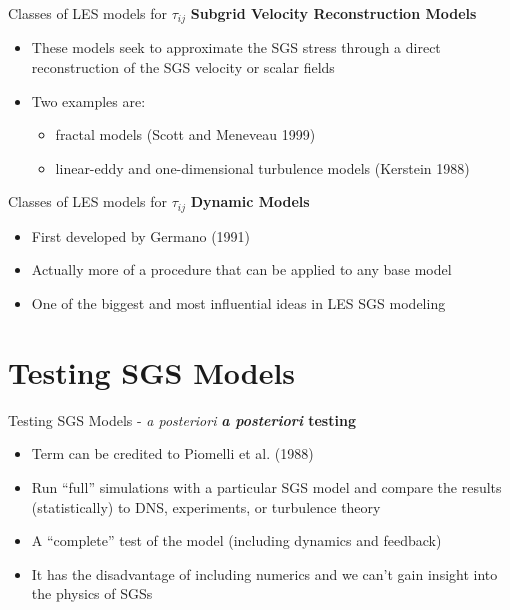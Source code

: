 
\begin{frame}{Classes of LES models for $\tau_{ij}$}
\textbf{Subgrid Velocity Reconstruction Models}
\begin{itemize}
	\item These models seek to approximate the SGS stress through a direct reconstruction of the SGS velocity or scalar fields
	\item Two examples are:
	\begin{itemize}
		\item fractal models (Scott and Meneveau 1999)
		\item linear-eddy and one-dimensional turbulence models (Kerstein 1988)
	\end{itemize}
\end{itemize}

\end{frame}


\begin{frame}{Classes of LES models for $\tau_{ij}$}
\textbf{Dynamic Models}
\begin{itemize}
	\item First developed by Germano (1991)
	\item Actually more of a procedure that can be applied to any base model
	\item One of the biggest and most influential ideas in LES SGS modeling
\end{itemize}

\end{frame}

\section{Testing SGS Models} %

\begin{frame}{Testing SGS Models - \textit{a posteriori}}
\textbf{\textit{a posteriori} testing}
\begin{itemize}
	\item Term can be credited to Piomelli et al. (1988)
	\item Run ``full'' simulations with a particular SGS model and compare the results (statistically) to DNS, experiments, or turbulence theory
	\item A ``complete'' test of the model (including dynamics and feedback)
	\item It has the disadvantage of including numerics and we can't gain insight into the physics of SGSs
\end{itemize}
\end{frame}

